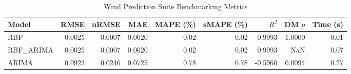 \begin{table}[htbp]
\centering
\caption{Wind Prediction Suite Benchmarking Metrics}
\label{tab:wind_prediction_summary}
\begin{tabular}{lrrrrrrrr}
\toprule
Model & RMSE & nRMSE & MAE & MAPE (\%) & sMAPE (\%) & $R^2$ & DM $p$ & Time (s) \\
\midrule
RBF & 0.0025 & 0.0007 & 0.0020 & 0.02 & 0.02 & 0.9993 & 1.0000 & 0.01 \\
RBF_ARIMA & 0.0025 & 0.0007 & 0.0020 & 0.02 & 0.02 & 0.9993 & NaN & 0.07 \\
ARIMA & 0.0923 & 0.0246 & 0.0725 & 0.78 & 0.78 & -0.5960 & 0.0094 & 0.27 \\
\bottomrule
\end{tabular}
\end{table}
